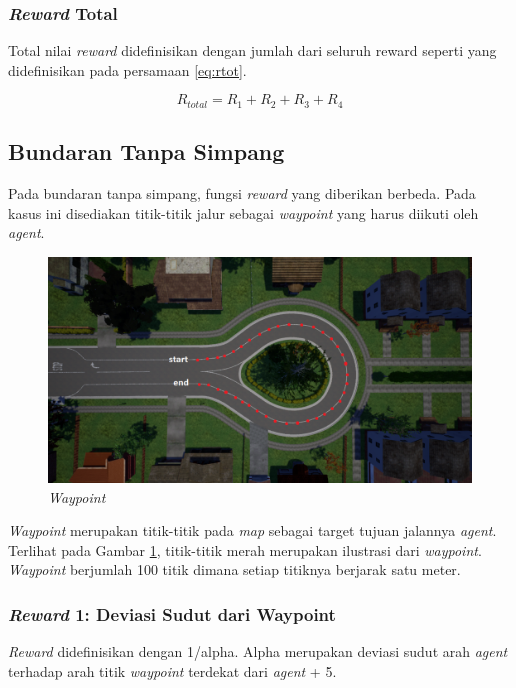 \subsubsection{\textit{Reward }Total}
Total nilai \textit{reward} didefinisikan dengan jumlah dari seluruh reward seperti yang didefinisikan pada persamaan \ref{eq:rtot}.

\begin{equation}
	R_{total} = R_1+R_2+R_3+R_4
	\label{eq:rtot}
\end{equation}

\subsection{Bundaran Tanpa Simpang}
Pada bundaran tanpa simpang, fungsi \textit{reward} yang diberikan berbeda. Pada kasus ini disediakan titik-titik jalur sebagai \textit{waypoint} yang harus diikuti oleh \textit{agent}.

\begin{figure}[H] 
	\centering
	\includegraphics[width=1\linewidth]{images/waypoint}
	\caption{\textit{Waypoint}}
	\label{fig:waypoint}
\end{figure}

\textit{Waypoint} merupakan titik-titik pada \textit{map} sebagai target tujuan jalannya \textit{agent}. Terlihat pada Gambar \ref{fig:waypoint}, titik-titik merah merupakan ilustrasi dari \textit{waypoint}. \textit{Waypoint} berjumlah 100 titik dimana setiap titiknya berjarak satu meter.

\subsubsection{\textit{Reward} 1: Deviasi Sudut dari Waypoint}
\textit{Reward} didefinisikan dengan 1/alpha. Alpha merupakan deviasi sudut arah \textit{agent }terhadap arah titik \textit{waypoint} terdekat dari \textit{agent} + 5.

